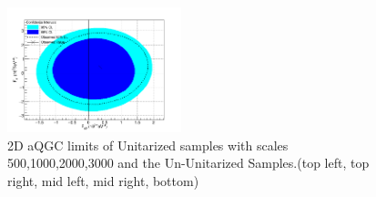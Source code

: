 \begin{figure}[h!]
\begin{center}
\includegraphics[width=0.45\textwidth]{figures/combination/CombUnit-Lim.png}
\end{center}
\caption{2D aQGC limits of Unitarized samples with scales 500,1000,2000,3000 and the Un-Unitarized Samples.(top left, top right, mid left, mid right, bottom)}
 \label{fig:aqgc_combined_2d}
 \end{figure}




